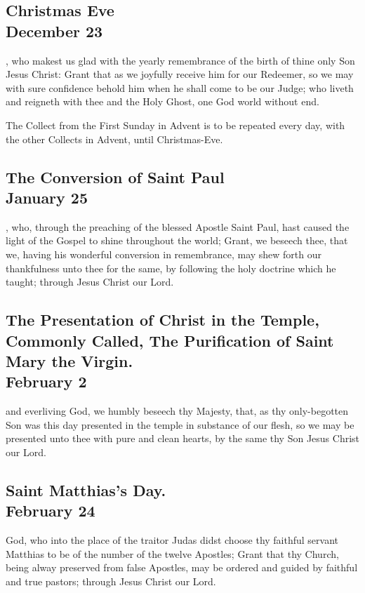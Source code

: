 \subsection{Christmas Eve\\
December 23}
, who makest us glad with the yearly remembrance of the birth of thine only Son Jesus Christ: Grant that as we joyfully receive him for our Redeemer, so we may with sure confidence behold him when he shall come to be our Judge; who liveth and reigneth with thee and the Holy Ghost, one God world without end.
\begin{secrubric}
The Collect from the First Sunday in Advent is to be repeated every day, with the other Collects in Advent, until Christmas-Eve.
\end{secrubric}

\subsection{The Conversion of Saint Paul\\
January 25}
, who, through the preaching of the blessed Apostle Saint Paul, hast caused the light of the Gospel to shine throughout the world; Grant, we beseech thee, that we, having his wonderful conversion in remembrance, may shew forth our thankfulness unto thee for the same, by following the holy doctrine which he taught; through Jesus Christ our Lord.

\subsection{The Presentation of Christ in the Temple,\\
Commonly Called, The Purification of Saint Mary the Virgin.\\
February 2}
 and everliving God, we humbly beseech thy Majesty, that, as thy only-begotten Son was this day presented in the temple in substance of our flesh, so we may be presented unto thee with pure and clean hearts, by the same thy Son Jesus Christ our Lord.

\subsection{Saint Matthias's Day.\\
February 24}
 God, who into the place of the traitor Judas didst choose thy faithful servant Matthias to be of the number of the twelve Apostles; Grant that thy Church, being alway preserved from false Apostles, may be ordered and guided by faithful and true pastors; through Jesus Christ our Lord.

